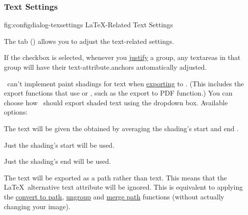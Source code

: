 \subsubsection{Text Settings}\label{sec:texconfigtext}


\FloatFig
  {fig:configdialog-texsettings}
  {}
  {LaTeX-Related Text Settings}

The  tab
()
allows you to adjust the text-related settings.


If the  \gls{checkbox} is selected,
whenever you \hyperref[sec:alignobjects]{justify} a \gls{group}, any
\glspl{textarea} in that group will have their
\glspl{text-attribute.anchor} automatically
adjusted.


\FlowframTk\ can't implement paint shadings for text when
\hyperref[sec:exportpgf]{exporting} to . (This includes the
export functions that use  or , such as
the export to PDF function.) You can choose how \FlowframTk\ should export
shaded text using the  dropdown
box. Available options:

\begin{deflist}
\itemtitle
 {}

\begin{itemdesc}
The text will be given the  obtained by averaging the
shading's start and end .
\end{itemdesc}

\itemtitle
 {}

\begin{itemdesc}
Just the shading's start  will be used.
\end{itemdesc}

\itemtitle
 {}

\begin{itemdesc}
Just the shading's end  will be used.
\end{itemdesc}

\itemtitle
 {}

\begin{itemdesc}
The text will be exported as a path rather than text. This means
that the \LaTeX\ alternative text attribute will be ignored. This is
equivalent to applying the 
\hyperref[sec:converttopath]{convert to path}, 
\hyperref[sec:grouping]{ungroup} and 
\hyperref[sec:mergepaths]{merge path}
functions (without actually changing your image).
\end{itemdesc}

\end{deflist}

